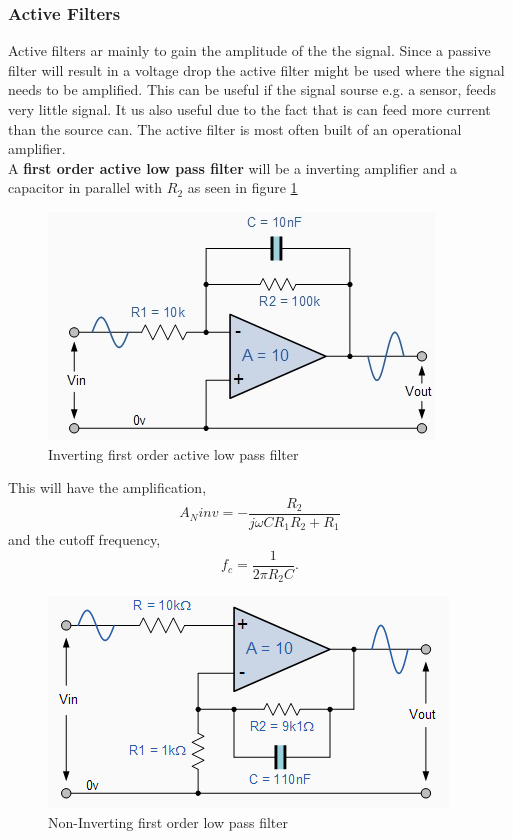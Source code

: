 \documentclass[12pt,a4paper]{article}
\begin{document}
    \subsubsection{Active Filters}
    Active filters ar mainly to gain the amplitude of the the signal.
    Since a passive filter will result in a voltage drop the active
    filter might be used where the signal needs to be amplified. This
    can be useful if the signal sourse e.g. a sensor, feeds very little
    signal. It us also useful due to the fact that is can feed more
    current than the source can. The active filter is most often built
    of an operational amplifier.\\
    A \textbf{first order active low pass filter} will be a inverting
    amplifier and a capacitor in parallel with $R_2$ as seen in figure 
    \ref{fig:1ordActLowPass}
    \begin{figure}[!h]
      \begin{center}
        \includegraphics{1ordActLowPass}
        \caption{Inverting first order active low pass filter}
        \label{fig:1ordActLowPass}
      \end{center}
    \end{figure}
    This will have the amplification,
    \begin{equation}
      A_Ninv=-\frac{R_2}{j\omega CR_1R_2+R_1}
    \end{equation}
    and the cutoff frequency,
    \begin{equation}
      f_c=\frac{1}{2\pi R_2C}.
    \end{equation}
    \begin{figure}[!h]
      \begin{center}
        \includegraphics{1ordNonInvActLowPass}
        \caption{Non-Inverting first order low pass filter}
        \label{fig:1ordNonInvLowPass}
      \end{center}
    \end{figure}
\end{document}
